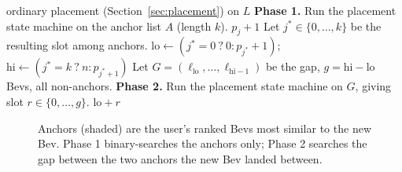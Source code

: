 \documentclass[11pt]{article}
\theoremstyle{plain}
\theoremstyle{definition}
\theoremstyle{remark}
\begin{document}
\begin{algorithm}[h]
\caption{Anchored placement of $b$ into $L$}\label{alg:anchored}
\begin{algorithmic}[1]
 \Return ordinary placement (Section~\ref{sec:placement}) on $L$ \EndIf
\State \textbf{Phase 1.} Run the placement state machine on the anchor list $A$ (length $k$). 
 \Return $p_j + 1$ \EndIf
\State Let $j^\ast \in \{0, \dots, k\}$ be the resulting slot among anchors.
\State $\mathrm{lo} \gets (j^\ast = 0\ ?\ 0 : p_{j^\ast} + 1)$;\quad $\mathrm{hi} \gets (j^\ast = k\ ?\ n : p_{j^\ast + 1})$ 
\State Let $G = (\ell_{\mathrm{lo}}, \dots, \ell_{\mathrm{hi}-1})$ be the gap, $g = \mathrm{hi} - \mathrm{lo}$ Bevs, all non-anchors.
\State \textbf{Phase 2.} Run the placement state machine on $G$, giving slot $r \in \{0, \dots, g\}$. 
\State \Return $\mathrm{lo} + r$
\end{algorithmic}
\end{algorithm}

\begin{figure}[h]
\centering
{}
\caption{Anchors (shaded) are the user's ranked Bevs most similar to the new Bev. Phase 1 binary-searches the anchors only; Phase 2 searches the gap between the two anchors the new Bev landed between.}
\end{figure}
\end{document}
